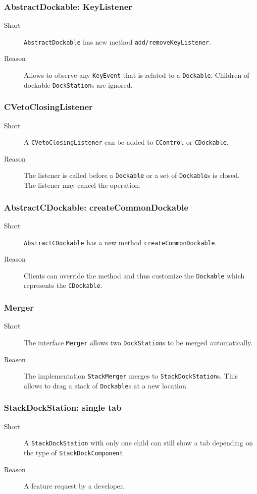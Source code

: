 \documentclass[a4paper,10pt]{article}
\newcommand{\src}[1]{\lstinline[basicstyle=\normalsize\ttfamily,keywordstyle=\normalsize\ttfamily,identifierstyle=\normalsize\ttfamily]|#1|}
\newcommand{\short}{\item[Short]}
\newcommand{\why}{\item[Reason]}
\begin{document}
\subsubsection{AbstractDockable: KeyListener}
\begin{description}
 \short \src{AbstractDockable} has new method \src{add/removeKeyListener}.
 \why Allows to observe any \src{KeyEvent} that is related to a \src{Dockable}. Children of dockable \src{DockStation}s are ignored.
\end{description}

\subsubsection{CVetoClosingListener}
\begin{description}
 \short A \src{CVetoClosingListener} can be added to \src{CControl} or \src{CDockable}.
 \why The listener is called before a \src{Dockable} or a set of \src{Dockable}s is closed. The listener may cancel the operation.
\end{description}

\subsubsection{AbstractCDockable: createCommonDockable}
\begin{description}
 \short \src{AbstractCDockable} has a new method \src{createCommonDockable}.
 \why Clients can override the method and thus customize the \src{Dockable} which represents the \src{CDockable}.
\end{description}

\subsubsection{Merger}
\begin{description}
 \short The interface \src{Merger} allows two \src{DockStation}s to be merged automatically.
 \why The implementation \src{StackMerger} merges to \src{StackDockStation}s. \linebreak This allows to drag a stack of \src{Dockable}s at a new location.
\end{description}

\subsubsection{StackDockStation: single tab}
\begin{description}
 \short A \src{StackDockStation} with only one child can still show a tab depending on the type of \src{StackDockComponent}
 \why A feature request by a developer.
\end{description}
\end{document}
